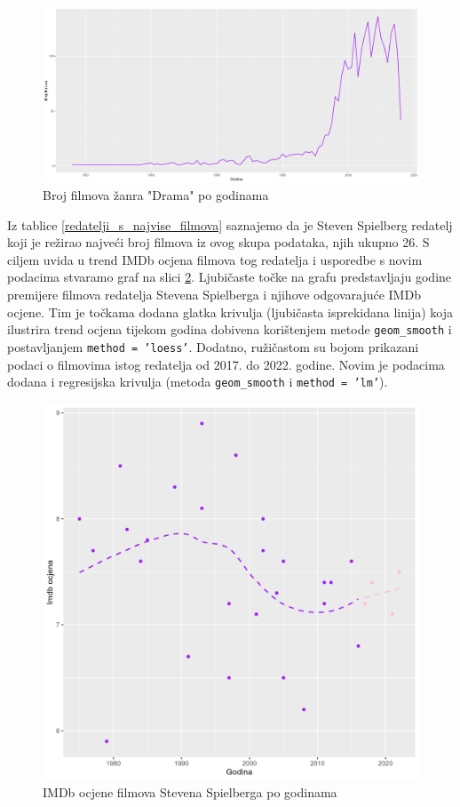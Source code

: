 	\begin{figure}[H]
		\centering
		\includegraphics[width=15cm]{../figures/analysis/popularnost_drame.png}
		\caption{Broj filmova žanra "Drama" po godinama}
		\label{drama}
	\end{figure}
	
	Iz tablice \ref{redatelji_s_najvise_filmova} saznajemo da je Steven Spielberg redatelj koji je režirao najveći broj filmova iz ovog skupa podataka, njih ukupno 26. S ciljem uvida u trend IMDb ocjena filmova tog redatelja i usporedbe s novim podacima stvaramo graf na slici \ref{spielberg}. Ljubičaste točke na grafu predstavljaju godine premijere filmova redatelja Stevena Spielberga i njihove odgovarajuće IMDb ocjene. Tim je točkama dodana glatka krivulja (ljubičasta isprekidana linija) koja ilustrira trend ocjena tijekom godina dobivena korištenjem metode \texttt{geom\_smooth} i postavljanjem \texttt{method = 'loess'}. Dodatno, ružičastom su bojom prikazani podaci o  filmovima istog redatelja od 2017. do 2022. godine. Novim je podacima dodana i regresijska krivulja (metoda \texttt{geom\_smooth} i \texttt{method = 'lm'}). 
	
	\begin{figure}[H]
		\centering
		\includegraphics[width=15cm]{../figures/analysis/spielberg.png}
		\caption{IMDb ocjene filmova Stevena Spielberga po godinama}
		\label{spielberg}
	\end{figure}
	
